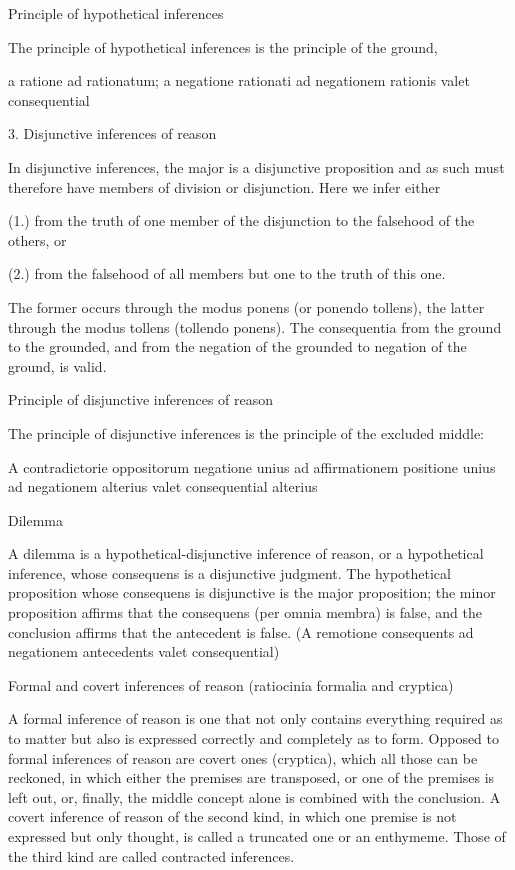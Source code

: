 Principle of hypothetical inferences

The principle of hypothetical inferences is
the principle of the ground,

a ratione ad rationatum;
a negatione rationati ad negationem rationis valet consequential

3. Disjunctive inferences of reason

In disjunctive inferences, the major is a disjunctive proposition
and as such must therefore have members of division or disjunction.
Here we infer either

(1.)    from the truth of one member of the disjunction
        to the falsehood of the others, or

(2.)    from the falsehood of all members but one
        to the truth of this one.

The former occurs through the modus ponens (or ponendo tollens),
the latter through the modus tollens (tollendo ponens).
The consequentia from the ground to the grounded,
and from the negation of the grounded to negation of the ground,
is valid.

Principle of disjunctive inferences of reason

The principle of disjunctive inferences is
the principle of the excluded middle:

A contradictorie oppositorum negatione unius ad affirmationem
positione unius ad negationem alterius valet consequential alterius

Dilemma

A dilemma is a hypothetical-disjunctive inference of reason,
or a hypothetical inference,
whose consequens is a disjunctive judgment.
The hypothetical proposition whose consequens is disjunctive
is the major proposition;
the minor proposition affirms that the consequens
(per omnia membra) is false,
and the conclusion affirms that the antecedent is false.
(A remotione consequents ad negationem antecedents valet consequential)

Formal and covert inferences of reason
(ratiocinia formalia and cryptica)

A formal inference of reason is one that
not only contains everything required as to matter
but also is expressed correctly and completely as to form.
Opposed to formal inferences of reason are covert ones (cryptica),
which all those can be reckoned,
in which either the premises are transposed,
or one of the premises is left out, or, finally,
the middle concept alone is combined with the conclusion.
A covert inference of reason of the second kind,
in which one premise is not expressed but only thought,
is called a truncated one or an enthymeme.
Those of the third kind are called contracted inferences.

